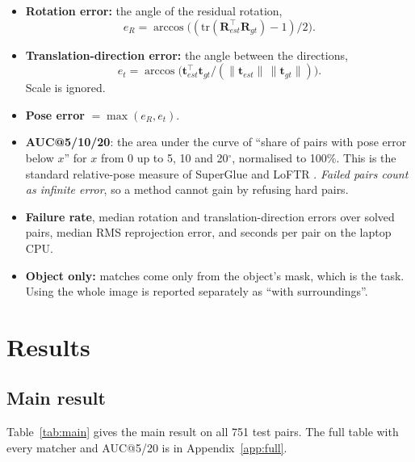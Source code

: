 \documentclass[11pt,a4paper]{article}
\newcommand{\R}{\mathbf{R}}
\newcommand{\tv}{\mathbf{t}}
\begin{document}
\begin{itemize}
  \item \textbf{Rotation error:} the angle of the residual rotation,
        \[e_R = \arccos\!\big((\mathrm{tr}(\R_{est}^\top\R_{gt})-1)/2\big).\]
  \item \textbf{Translation-direction error:} the angle between the directions,
        \[e_t = \arccos\!\big(\tv_{est}^\top\tv_{gt} / (\|\tv_{est}\|\,\|\tv_{gt}\|)\big).\] Scale is ignored.
  \item \textbf{Pose error} $= \max(e_R, e_t)$.
  \item \textbf{AUC@5/10/20}: the area under the curve of ``share of pairs with pose error below
        $x$'' for $x$ from 0 up to 5, 10 and 20$^\circ$, normalised to 100\%. This is the standard
        relative-pose measure of SuperGlue \cite{superglue} and LoFTR \cite{loftr}. \emph{Failed pairs
        count as infinite error}, so a method cannot gain by refusing hard pairs.
  \item \textbf{Failure rate}, median rotation and translation-direction errors over solved pairs,
        median RMS reprojection error, and seconds per pair on the laptop CPU.
  \item \textbf{Object only:} matches come only from the object's mask, which is the task.
        Using the whole image is reported separately as ``with surroundings''.
\end{itemize}

\section{Results}

\subsection{Main result}

Table~\ref{tab:main} gives the main result on all 751 test pairs. The full table with every
matcher and AUC@5/20 is in Appendix~\ref{app:full}.
\end{document}
